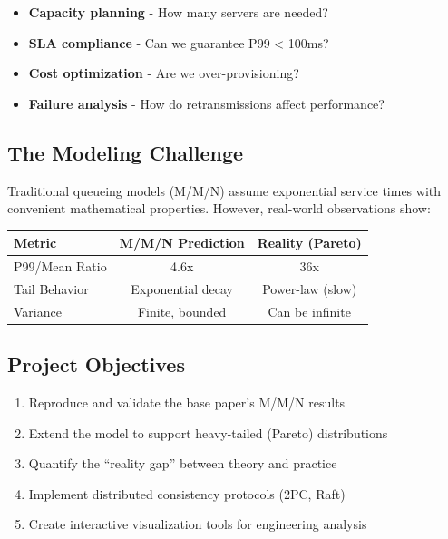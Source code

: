 \documentclass[11pt,a4paper]{article}
\begin{document}
\begin{itemize}
    \item \textbf{Capacity planning} - How many servers are needed?
    \item \textbf{SLA compliance} - Can we guarantee P99 < 100ms?
    \item \textbf{Cost optimization} - Are we over-provisioning?
    \item \textbf{Failure analysis} - How do retransmissions affect performance?
\end{itemize}

\subsection{The Modeling Challenge}

Traditional queueing models (M/M/N) assume exponential service times with convenient mathematical properties. However, real-world observations show:

\begin{center}
\begin{tabular}{lcc}
\toprule
\textbf{Metric} & \textbf{M/M/N Prediction} & \textbf{Reality (Pareto)} \\
\midrule
P99/Mean Ratio & 4.6x & 36x \\
Tail Behavior & Exponential decay & Power-law (slow) \\
Variance & Finite, bounded & Can be infinite \\
\bottomrule
\end{tabular}
\end{center}

\subsection{Project Objectives}

\begin{enumerate}
    \item Reproduce and validate the base paper's M/M/N results
    \item Extend the model to support heavy-tailed (Pareto) distributions
    \item Quantify the ``reality gap'' between theory and practice
    \item Implement distributed consistency protocols (2PC, Raft)
    \item Create interactive visualization tools for engineering analysis
\end{enumerate}
\end{document}
